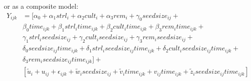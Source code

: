 \documentclass[
]{krantz}
\begin{document}
or as a composite model:
\begin{align*}
Y_{ijk} & = [\alpha_{0}+\alpha_{1}\textstyle{strl}_{i}+\alpha_{2}\textstyle{cult}_{i}+\alpha_{3}\textstyle{rem}_{i} +
 \gamma_{0}\textstyle{seedsize}_{ij} + \\
 & \beta_{0}\textstyle{time}_{ijk} + \beta_{1}\textstyle{strl}_{i}\textstyle{time}_{ijk}+\beta_{2}\textstyle{cult}_{i}\textstyle{time}_{ijk}+ \beta_{3}\textstyle{rem}_{i}\textstyle{time}_{ijk} + \\
 & \gamma_{1}\textstyle{strl}_{i}\textstyle{seedsize}_{ij}+\gamma_{2}\textstyle{cult}_{i}\textstyle{seedsize}_{ij}+ \gamma_{3}\textstyle{rem}_{i}\textstyle{seedsize}_{ij} + \\
 & \delta_{0}\textstyle{seedsize}_{ij}\textstyle{time}_{ijk} + \delta_{1}\textstyle{strl}_{i}\textstyle{seedsize}_{ij}\textstyle{time}_{ijk} + \delta_{2}\textstyle{cult}_{i}\textstyle{seedsize}_{ij}\textstyle{time}_{ijk} + \\
 & \delta_{3}\textstyle{rem}_{i}\textstyle{seedsize}_{ij}\textstyle{time}_{ijk}] + \\
 & [\tilde{u}_{i} + u_{ij} + \epsilon_{ijk} + \tilde{w}_{i}\textstyle{seedsize}_{ij} + \tilde{v}_{i}\textstyle{time}_{ijk} + v_{ij}\textstyle{time}_{ijk} + \tilde{z}_{i}\textstyle{seedsize}_{ij}\textstyle{time}_{ijk} ]
\end{align*}
\end{document}
